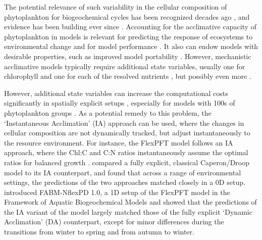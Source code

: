 \documentclass[gmd, manuscript]{copernicus}
\newcommand{\onur}[1]{\textcolor{blue}{\{Onur: #1\}}}
\begin{document}
The potential relevance of such variability in the cellular composition of phytoplankton for biogeochemical cycles has been recognized decades ago \citep{Redfield1934,Redfield1958}, and evidence has been building ever since \citep{Lenton2007,Bonachela2016,Pahlow2020}.  Accounting for the acclimative capacity of phytoplankton in models is relevant for predicting the response of ecosystems to environmental change \citep{Kwiatkowski2018,Kerimoglu2018} and for model performance \citep{Ayata2013, Kerimoglu2017, Chen2018a}.  It also can endow models with desirable properties, such as improved model portability \citep{Anugerahanti2021}. However, mechanistic acclimative models typically require additional state variables, usually one for chlorophyll and one for each of the resolved nutrients \citep[e.g.,][]{Geider1998, Flynn2003}, but possibly even more \citep{Bonachela2013, Wirtz2016, Inomura2020}.%

However, additional state variables can increase the computational costs significantly in spatially explicit setups \citep{Fulton2003}, especially for models with 100s of phytoplankton groups \citep[e.g.,][]{Follows2007, Dutkiewicz2020}. As a potential remedy to this problem, the `Instantaneous Acclimation' (IA) approach can be used, where the changes in cellular composition are not dynamically tracked, but adjust instantaneously to the resource environment. For instance, the FlexPFT model \citep{Smith2016} follows an IA approach, where the Chl:C and C:N ratios instantaneously assume the optimal ratios for balanced growth \citep{Pahlowetal13}.  \citet{Ward2017} compared a fully explicit, classical Caperon/Droop model \citep{Caperon1968,Droop1968} to its IA counterpart, and found that across a range of environmental settings, the predictions of the two approaches matched closely in a 0D setup.  \citet{Kerimoglu2021} introduced FABM-NflexPD 1.0, a 1D setup of the FlexPFT model in the Framework of Aquatic Biogeochemical Models \citep[FABM,][]{Bruggeman2014} and showed that the predictions of the IA variant of the model largely matched those of the fully explicit `Dynamic Acclimation' (DA) counterpart, except for minor differences during the transitions from winter to spring and from autumn to winter.
\end{document}
